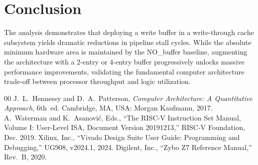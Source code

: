 \documentclass[conference]{IEEEtran}
\begin{document}
\section*{Conclusion}
The analysis demonstrates that deploying a write buffer in a write-through cache subsystem yields dramatic reductions in pipeline stall cycles. While the absolute minimum hardware area is maintained by the NO\_buffer baseline, augmenting the architecture with a 2-entry or 4-entry buffer progressively unlocks massive performance improvements, validating the fundamental computer architecture trade-off between processor throughput and logic utilization.

\begin{thebibliography}{00}
 J.~L.~Hennessy and D.~A.~Patterson, \textit{Computer Architecture: A Quantitative Approach}, 6th~ed. Cambridge, MA, USA: Morgan Kaufmann, 2017.
 A.~Waterman and K.~Asanovi\'{c}, Eds., ``The RISC-V Instruction Set Manual, Volume I: User-Level ISA, Document Version 20191213,'' RISC-V Foundation, Dec. 2019.
 Xilinx, Inc., ``Vivado Design Suite User Guide: Programming and Debugging,'' UG908, v2024.1, 2024.
 Digilent, Inc., ``Zybo Z7 Reference Manual,'' Rev.~B, 2020.
\end{thebibliography}
\end{document}
